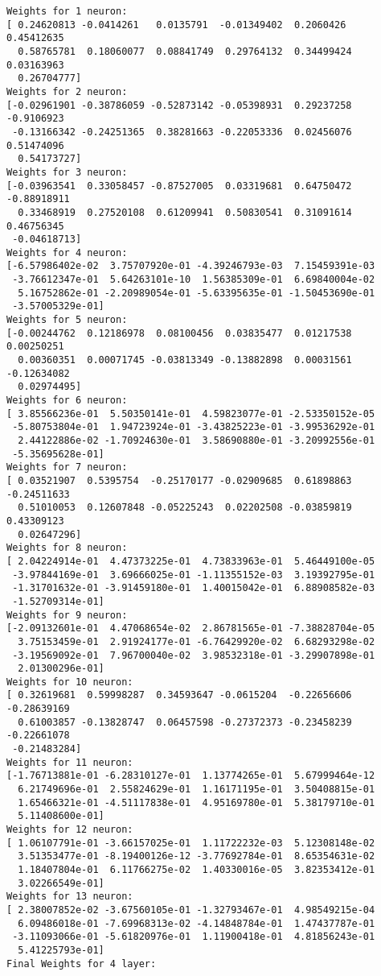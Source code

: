 \documentclass[11pt]{article}
\begin{document}
\begin{Verbatim}[commandchars=\\\{\}]
Weights for 1 neuron:
[ 0.24620813 -0.0414261   0.0135791  -0.01349402  0.2060426   0.45412635
  0.58765781  0.18060077  0.08841749  0.29764132  0.34499424  0.03163963
  0.26704777]
Weights for 2 neuron:
[-0.02961901 -0.38786059 -0.52873142 -0.05398931  0.29237258 -0.9106923
 -0.13166342 -0.24251365  0.38281663 -0.22053336  0.02456076  0.51474096
  0.54173727]
Weights for 3 neuron:
[-0.03963541  0.33058457 -0.87527005  0.03319681  0.64750472 -0.88918911
  0.33468919  0.27520108  0.61209941  0.50830541  0.31091614  0.46756345
 -0.04618713]
Weights for 4 neuron:
[-6.57986402e-02  3.75707920e-01 -4.39246793e-03  7.15459391e-03
 -3.76612347e-01  5.64263101e-10  1.56385309e-01  6.69840004e-02
  5.16752862e-01 -2.20989054e-01 -5.63395635e-01 -1.50453690e-01
 -3.57005329e-01]
Weights for 5 neuron:
[-0.00244762  0.12186978  0.08100456  0.03835477  0.01217538  0.00250251
  0.00360351  0.00071745 -0.03813349 -0.13882898  0.00031561 -0.12634082
  0.02974495]
Weights for 6 neuron:
[ 3.85566236e-01  5.50350141e-01  4.59823077e-01 -2.53350152e-05
 -5.80753804e-01  1.94723924e-01 -3.43825223e-01 -3.99536292e-01
  2.44122886e-02 -1.70924630e-01  3.58690880e-01 -3.20992556e-01
 -5.35695628e-01]
Weights for 7 neuron:
[ 0.03521907  0.5395754  -0.25170177 -0.02909685  0.61898863 -0.24511633
  0.51010053  0.12607848 -0.05225243  0.02202508 -0.03859819  0.43309123
  0.02647296]
Weights for 8 neuron:
[ 2.04224914e-01  4.47373225e-01  4.73833963e-01  5.46449100e-05
 -3.97844169e-01  3.69666025e-01 -1.11355152e-03  3.19392795e-01
 -1.31701632e-01 -3.91459180e-01  1.40015042e-01  6.88908582e-03
 -1.52709314e-01]
Weights for 9 neuron:
[-2.09132601e-01  4.47068654e-02  2.86781565e-01 -7.38828704e-05
  3.75153459e-01  2.91924177e-01 -6.76429920e-02  6.68293298e-02
 -3.19569092e-01  7.96700040e-02  3.98532318e-01 -3.29907898e-01
  2.01300296e-01]
Weights for 10 neuron:
[ 0.32619681  0.59998287  0.34593647 -0.0615204  -0.22656606 -0.28639169
  0.61003857 -0.13828747  0.06457598 -0.27372373 -0.23458239 -0.22661078
 -0.21483284]
Weights for 11 neuron:
[-1.76713881e-01 -6.28310127e-01  1.13774265e-01  5.67999464e-12
  6.21749696e-01  2.55824629e-01  1.16171195e-01  3.50408815e-01
  1.65466321e-01 -4.51117838e-01  4.95169780e-01  5.38179710e-01
  5.11408600e-01]
Weights for 12 neuron:
[ 1.06107791e-01 -3.66157025e-01  1.11722232e-03  5.12308148e-02
  3.51353477e-01 -8.19400126e-12 -3.77692784e-01  8.65354631e-02
  1.18407804e-01  6.11766275e-02  1.40330016e-05  3.82353412e-01
  3.02266549e-01]
Weights for 13 neuron:
[ 2.38007852e-02 -3.67560105e-01 -1.32793467e-01  4.98549215e-04
  6.09486018e-01 -7.69968313e-02 -4.14848784e-01  1.47437787e-01
 -3.11093066e-01 -5.61820976e-01  1.11900418e-01  4.81856243e-01
  5.41225793e-01]
Final Weights for 4 layer:


\end{Verbatim}
\end{document}
